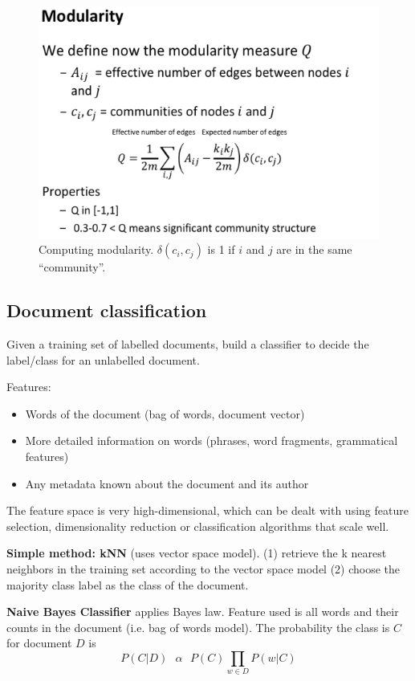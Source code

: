     \begin{figure}[htp]
      \centering
        \includegraphics[width=.6\textwidth]{images/modmod.png}
        \caption{Computing modularity. $\delta(c_i, c_j)$ is 1 if $i$ and $j$ are in the same ``community''.}
        \label{fig:modmod}
    \end{figure}


\subsection{Document classification} %
\label{sub:document_classification}
	Given a training set of labelled documents, build a classifier to decide the label/class for an unlabelled document.

	Features:
	\begin{itemize}
		\item Words of the document (bag of words, document vector)
		\item More detailed information on words (phrases, word fragments, grammatical features)
		\item Any metadata known about the document and its author
	\end{itemize}

	The feature space is very high-dimensional, which can be dealt with using feature selection, dimensionality reduction or classification algorithms that scale well.

	\textbf{Simple method: kNN} (uses vector space model). (1) retrieve the k nearest neighbors in the training set according to the vector space model (2) choose the majority class label as the class of the document.

	\textbf{Naive Bayes Classifier} applies Bayes law. Feature used is all words and their counts in the document (i.e. bag of words model). The probability the class is $C$ for document $D$ is $$P(C|D)\text{  }\alpha\text{  } P(C)\prod_{w\in D}{P(w|C)}$$

